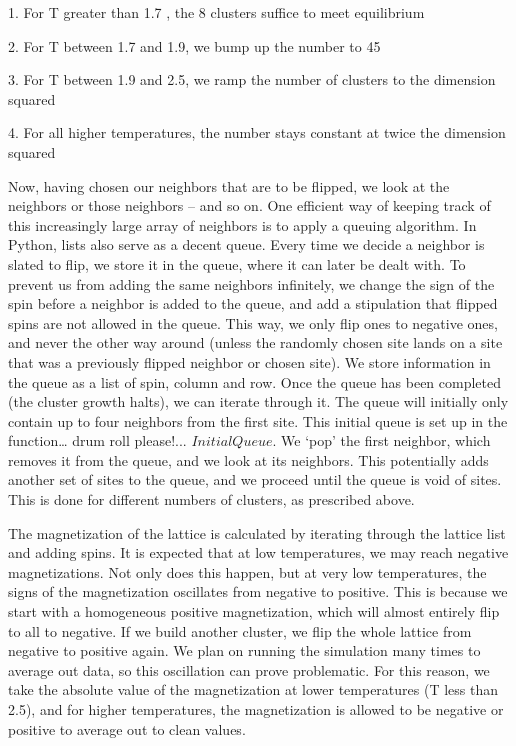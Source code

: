 \documentclass[a4paper]{article}
\begin{document}
	1. For T greater than 1.7 , the 8 clusters suffice to meet equilibrium
    
  
	2. For  T between 1.7 and 1.9, we bump up the number to 45
    
    
	3. For T between 1.9 and 2.5, we ramp the number of clusters to the dimension squared
    
   
	4. For all higher temperatures, the number stays constant at twice the dimension squared
    
 
Now, having chosen our neighbors that are to be flipped, we look at the neighbors or those neighbors – and so on. One efficient way of keeping track of this increasingly large array of neighbors is to apply a queuing algorithm. In Python, lists also serve as a decent queue. Every time we decide a neighbor is slated to flip, we store it in the queue, where it can later be dealt with. To prevent us from adding the same neighbors infinitely, we change the sign of the spin before a neighbor is added to the queue, and add a stipulation that flipped spins are not allowed in the queue. This way, we only flip ones to negative ones, and never the other way around (unless the randomly chosen site lands on a site that was a previously flipped neighbor or chosen site). We store information in the queue as a list of spin, column and row. Once the queue has been completed (the cluster growth halts), we can iterate through it. The queue will initially only contain up to four neighbors from the first site. This initial queue is set up in the function… drum roll please!... $Initial   Queue$. We ‘pop’ the first neighbor, which removes it from the queue, and we look at its neighbors. This potentially adds another set of sites to the queue, and we proceed until the queue is void of sites. This is done for different numbers of clusters, as prescribed above. 


The magnetization of the lattice is calculated by iterating through the lattice list and adding spins. It is expected that at low temperatures, we may reach negative magnetizations. Not only does this happen, but at very low temperatures, the signs of the magnetization oscillates from negative to positive. This is because we start with a homogeneous positive magnetization, which will almost entirely flip to all to negative. If we build another cluster, we flip the whole lattice from negative to positive again. We plan on running the simulation many times to average out data, so this oscillation can prove problematic. For this reason, we take the absolute value of the magnetization at lower temperatures (T less than 2.5), and for higher temperatures, the magnetization is allowed to be negative or positive to average out to clean values. 
\end{document}

